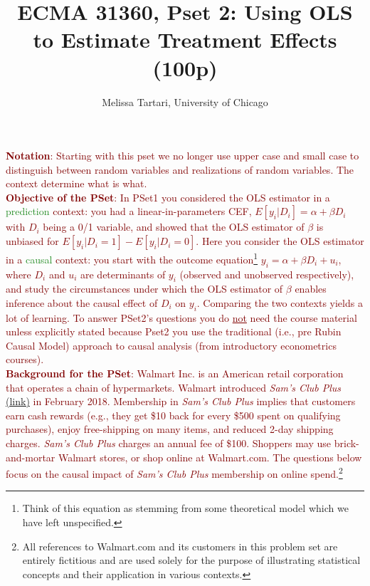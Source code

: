 \documentclass{article}
\begin{document}
\title{ECMA 31360, Pset 2: Using OLS to Estimate Treatment Effects (100p)}
\date{}
\author{Melissa Tartari, University of Chicago}
\maketitle
\thispagestyle{fancy}


\noindent \textcolor{Maroon}{\textbf{Notation}: Starting with this pset we no longer use upper case and small case to distinguish between random variables and realizations of random variables. The context determine what is what.}\\

\noindent \textcolor{Maroon}{\textbf{Objective of the PSet}: In PSet1 you considered the OLS estimator in a \textcolor{ForestGreen}{prediction} context: you had a linear-in-parameters CEF, $E[y_i|D_i]=\alpha+\beta D_i$ with $D_i$ being a 0/1 variable, and showed that the OLS estimator of $\beta$ is unbiased for $E[y_i|D_i=1]-E[y_i|D_i=0]$. Here you consider the OLS estimator in a \textcolor{ForestGreen}{causal} context: you start with the outcome equation\footnote{Think of this equation as stemming from some theoretical model which we have left unspecified.} $y_i=\alpha+\beta D_i + u_i$, where $D_i$ and $u_i$ are determinants of $y_i$ (observed and unobserved respectively), and study the circumstances under which the OLS estimator of $\beta$ enables inference about the causal effect of $D_i$ on $y_i$. Comparing the two contexts yields a lot of learning. To answer PSet2's questions you do \underline{not} need the course material unless explicitly stated because Pset2 you use the traditional (i.e., pre Rubin Causal Model) approach to causal analysis (from introductory econometrics courses).}\\

\noindent \textcolor{Maroon}{\textbf{Background for the PSet}: Walmart Inc. is an American retail corporation that operates a chain of hypermarkets. Walmart introduced \textit{Sam's Club Plus} \href{https://www.samsclub.com/sams/pagedetails/content.jsp?pageName=aboutSams&xid=hpg_member_3}{(link)} in February 2018. Membership in \textit{Sam's Club Plus} implies that customers earn cash rewards (e.g., they get \$10 back for every \$500 spent on qualifying purchases), enjoy free-shipping on many items, and reduced 2-day shipping charges. \textit{Sam's Club Plus} charges an annual fee of \$100. Shoppers may use brick-and-mortar Walmart stores, or shop online at Walmart.com. The questions below focus on the causal impact of \textit{Sam's Club Plus} membership on online spend.}\footnote{All references to Walmart.com and its customers in this problem set are entirely fictitious and are used solely for the purpose of illustrating
statistical concepts and their application in various contexts.}  
\end{document}
